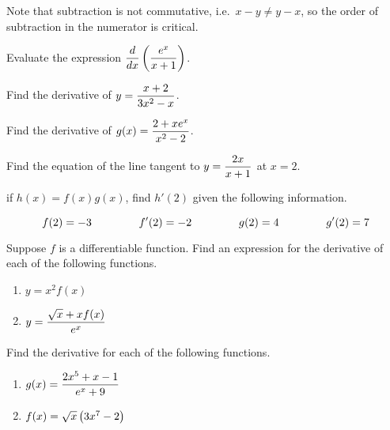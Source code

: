 \documentclass[12pt]{article}
\begin{document}
\vspace{3mm}

Note that subtraction is not commutative, i.e.\ $x-y\neq y-x$, so the order of subtraction in the numerator is critical.

\vspace{10mm}

\Example Evaluate the expression $\displaystyle\frac{d}{dx}\left(\frac{e^x}{x+1}\right)$.

\vspace{50mm}

\Example Find the derivative of $y=\displaystyle\frac{x+2}{3x^2-x}$.

\newpage

\Example Find the derivative of $g(x)=\displaystyle\frac{2+xe^x}{x^2-2}$.

\vspace{55mm}

\Example Find the equation of the line tangent to $y=\displaystyle\frac{2x}{x+1}$ at $x=2$.

\vspace{55mm}

\Example if $h(x)=f(x)g(x)$, find $h'(2)$ given the following information.

$$f(2)=-3\hspace{15mm} f'(2)=-2 \hspace{15mm} g(2)=4 \hspace{15mm} g'(2)=7$$

\newpage 

\Example Suppose $f$ is a differentiable function. Find an expression for the derivative of each of the following functions.

\begin{enumerate}
\item[\tc{1}] $y=x^2f(x)$

\vspace{35mm}

\item[\tc{2}] $y=\displaystyle\frac{\sqrt{x}+xf(x)}{e^x}$

\vspace{35mm}
\end{enumerate}

\Example Find the derivative for each of the following functions.

\begin{enumerate}
\item[\tc{1}] $g(x)=\displaystyle\frac{2x^5+x-1}{e^x+9}$

\vspace{35mm}

\item[\tc{2}] $f(x)=\sqrt{x}\left( 3x^7-2\right)$
\end{enumerate}
\end{document}
